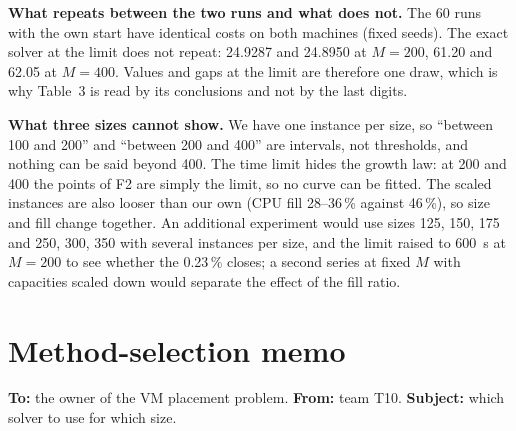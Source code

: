 \documentclass[11pt,a4paper]{article}
\begin{document}
\textbf{What repeats between the two runs and what does not.} The 60 runs with the own start have identical costs on both machines (fixed seeds). The exact solver at the limit does not repeat: 24.9287 and 24.8950 at $M=200$, 61.20 and 62.05 at $M=400$. Values and gaps at the limit are therefore one draw, which is why Table~3 is read by its conclusions and not by the last digits.

\textbf{What three sizes cannot show.} We have one instance per size, so ``between 100 and 200'' and ``between 200 and 400'' are intervals, not thresholds, and nothing can be said beyond 400. The time limit hides the growth law: at 200 and 400 the points of F2 are simply the limit, so no curve can be fitted. The scaled instances are also looser than our own (CPU fill 28--36\,\% against 46\,\%), so size and fill change together. An additional experiment would use sizes 125, 150, 175 and 250, 300, 350 with several instances per size, and the limit raised to 600~s at $M=200$ to see whether the 0.23\,\% closes; a second series at fixed $M$ with capacities scaled down would separate the effect of the fill ratio.

\section{Method-selection memo}

\textbf{To:} the owner of the VM placement problem. \textbf{From:} team T10. \textbf{Subject:} which solver to use for which size.
\end{document}
